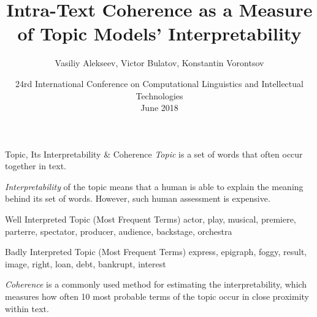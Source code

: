 \documentclass[russian]{beamer}
\title[Intra-Text Coherence]
{
  Intra-Text Coherence as a Measure of Topic Models’ Interpretability
}
\subtitle{}
\author[Vasiliy Alekseev]{
  Vasiliy Alekseev, %
  Victor Bulatov,
  Konstantin Vorontsov
}
\institute[]
{
  \footnotesize
}
\date[Dialogue 2018]
{
  \footnotesize
  {
    24rd International Conference on Computational Linguistics and Intellectual Technologies\\ \bigskip 1 June 2018
  }
}
\begin{document}

		

  
\frame{\titlepage}


\begin{frame}{Topic, Its Interpretability \& Coherence}
  \emph{Topic} is a set of words that often occur together in text.
  
  \medskip
  
  \emph{Interpretability} of the topic means that a human is able to explain the meaning behind its set of words.
  However, such human assessment is expensive.
  
  \vspace{0.25cm}
  
  \begin{exampleblock}{Well Interpreted Topic (Most Frequent Terms)}
    actor, play, musical, premiere, parterre, spectator, producer, audience, backstage, orchestra
  \end{exampleblock}
  
  \begin{alertblock}{Badly Interpreted Topic (Most Frequent Terms)}
    express, epigraph, foggy, result, image, right, 
    loan, debt, bankrupt, interest
  \end{alertblock}
  
  \smallskip
  
  \emph{Coherence} is a commonly used method for estimating the interpretability, which measures how often 10 most probable terms of the topic occur in close proximity within text.
\end{frame}
\end{document}
